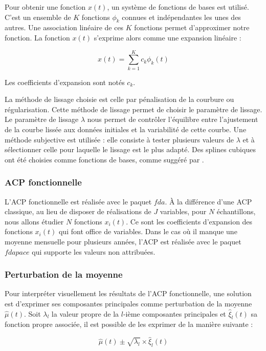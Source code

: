 \documentclass[12pt]{article}
\begin{document}
Pour obtenir une fonction $x(t)$, un système de fonctions de bases est utilisé. C'est un ensemble de $K$ fonctions $\phi_k$ connues et indépendantes les unes des autres. Une association linéaire de ces $K$ fonctions permet d'approximer notre fonction. La fonction $x(t)$ s'exprime alors comme une expansion linéaire : 

\[x(t)=\sum_{k=1}^Kc_k\phi_k(t)\]

Les coefficients d'expansion sont notés $c_k$.

La méthode de lissage choisie est celle par pénalisation de la courbure ou régularisation. Cette méthode de lissage permet de choisir le paramètre de lissage. Le paramètre de lissage $\lambda$ nous permet de contrôler l'équilibre entre l'ajustement de la courbe lissée aux données initiales et la variabilité de cette courbe. Une méthode subjective est utilisée : elle consiste à tester plusieurs valeurs de $\lambda$ et à sélectionner celle pour laquelle le lissage est le plus adapté. Des splines cubiques ont été choisies comme fonctions de bases, comme suggéré par \citet{Ramsay1998}.

\subsubsection{ACP fonctionnelle}

L'ACP fonctionnelle est réalisée avec le paquet $fda$. À la différence d’une ACP classique, au lieu de disposer de réalisations de $J$ variables, pour $N$ échantillons, nous allons étudier $N$ fonctions $x_i(t)$. Ce sont les coefficients d’expansion des fonctions $x_i(t)$ qui font office de variables. Dans le cas où il manque une moyenne mensuelle pour plusieurs années, l’ACP est réalisée avec le paquet $fdapace$ qui supporte les valeurs non attribuées.

\subsubsection{Perturbation de la moyenne}

Pour interpréter visuellement les résultats de l’ACP fonctionnelle, une solution est d'exprimer ses composantes principales comme perturbation de la moyenne $\hat{\mu}(t)$. Soit $\lambda_l$ la valeur propre de la $l$-ième composantes principales et $\hat{\xi}_l(t)$ sa fonction propre associée, il est possible de les exprimer de la manière suivante \citep{Nerini2021} : 

\[\hat{\mu}(t) \pm \sqrt{\lambda_l}\times \hat{\xi}_l(t)\]
\end{document}
